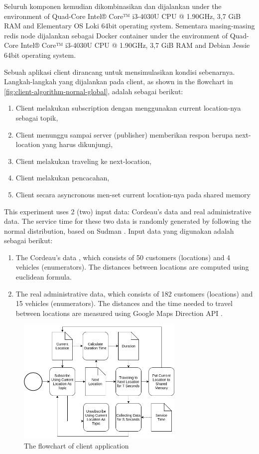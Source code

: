\documentclass[conference]{IEEEtran}
\begin{document}
Seluruh komponen kemudian dikombinasikan dan dijalankan under the environment of Quad-Core Intel® Core™ i3-4030U CPU @ 1.90GHz, 3,7 GiB RAM and Elementary OS Loki 64bit operating system. Sementara masing-masing redis node dijalankan sebagai Docker container under the environment of Quad-Core Intel® Core™ i3-4030U CPU @ 1.90GHz, 3,7 GiB RAM and Debian Jessie 64bit operating system.

Sebuah aplikasi client dirancang untuk mensimulasikan kondisi sebenarnya. Langkah-langkah yang dijalankan pada client, as shown in the flowchart in \autoref{fig:client-algorithm-nornal-global}, adalah sebagai berikut:

\begin{enumerate}
	\item Client melakukan subscription dengan menggunakan current location-nya sebagai topik,
	\item Client menunggu sampai server (publisher) memberikan respon berupa next-location yang harus dikunjungi, 
	\item Client melakukan traveling ke next-location, 
	\item Client melakukan pencacahan, 
	\item Client secara asyncronous men-set current location-nya pada shared memory
\end{enumerate}

This experiment uses 2 (two) input data: Cordeau's data and real administrative data. The service time for these two data is randomly generated by following the normal distribution, based on Sudman \cite{sudman_time_1965}. Input data yang digunakan adalah sebagai berikut:

\begin{enumerate}
	\item The Cordeau's data \cite{cordeau_tabu_1997}, which consists of 50 customers (locations) and 4 vehicles (enumerators). The distances between locations are computed using euclidean formula. 
	\item The real administrative data, which consists of 182 customers (locations) and 15 vehicles (enumerators). The distances and the time needed to travel between locations are measured using Google Maps Direction API \cite{google_google_2016}. 
\end{enumerate}

\begin{figure}[!]
	\centering
	\includegraphics[width=8cm]{Resources/Images/client-algorithm-nornal-global}
	\caption{The flowchart of client application}
	\label{fig:client-algorithm-nornal-global}
\end{figure}
\end{document}
